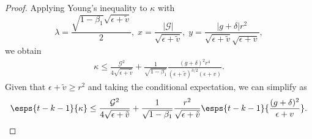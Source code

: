 \documentclass[11pt, letterpaper]{article}
\begin{document}
\begin{proof}
Applying Young's inequality to $\kappa$ with $$\lambda = \frac{\sqrt{1 - \beta_1}\sqrt{\epsilon+\tilde{v}}}{2}, \; x =
\frac{|\mathcal{G}|}{\sqrt{\epsilon+\tilde{v}}}, \; y = \frac{|g+\delta|r^2}{\sqrt{\epsilon+\tilde{v}}\sqrt{\epsilon+v}},$$
we obtain
\begin{align*}
    \kappa \leq \frac{\mathcal{G}^2}{4 \sqrt{\epsilon+\tilde{v}}} + \frac1{\sqrt{1-\beta_1}}\frac{(g+\delta)^2 r^4}{(\epsilon + \tilde{v})^{3/2}(\epsilon + v)}.
\end{align*}
Given that $\epsilon + \tilde{v} \geq r^2$ and taking the conditional expectation, we can simplify as
\begin{align}
\label{app:eq:bound_kappa_lemmaC}
    \esps{t- k - 1}{\kappa} \leq \frac{\mathcal{G}^2}{4 \sqrt{\epsilon+\tilde{v}}} + \frac1{\sqrt{1-\beta_1}}\frac{r^2}{\sqrt{\epsilon+\tilde{v}}}\esps{t -k - 1}{\frac{(g+\delta)^2}{\epsilon
    + v}}.
\end{align}


\end{proof}
\end{document}

